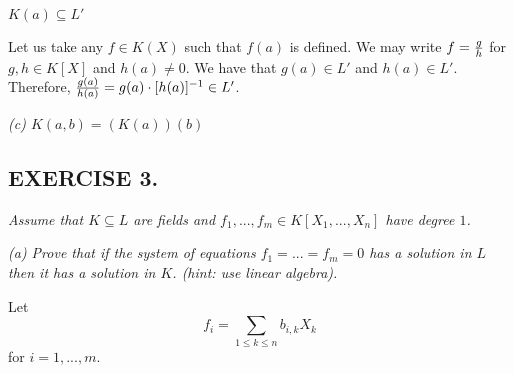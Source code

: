 \documentclass{article}
\begin{document}

$K(a)\subseteq L'$

Let us take any $f\in K(X)$ such that $f(a)$ is defined. We may write $f={g\over h}$ for $g,h\in K[X]$ and $h(a)\neq 0$. We have that $g(a)\in L'$ and $h(a)\in L'$. Therefore, ${g(a)\over h(a)}=g(a)\cdot[h(a)]^{-1}\in L'$.
\smallskip

\emph{\color{pink}(c) $K(a, b)=(K(a))(b)$}
\smallskip

\subsection*{EXERCISE 3.}
\emph{Assume that $K\subseteq L$ are fields and $f_1,...,f_m\in K[X_1,...,X_n]$ have degree $1$.}

\emph{(a) Prove that if the system of equations $f_1=...=f_m=0$ has a solution in $L$ then it has a solution in $K$. (hint: use linear algebra).}
\smallskip

Let
$$f_i=\sum\limits_{1\leq k\leq n}b_{i, k}X_k$$
for $i=1,...,m$.




\end{document}
